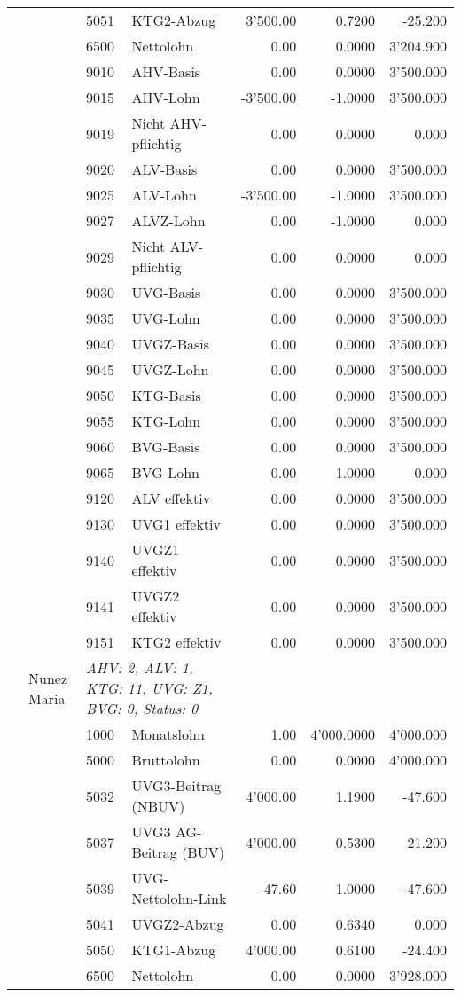 \documentclass[15pt,a4paper]{article}
\begin{document}
\begin{longtable}{@{\extracolsep{\fill}}l l l l|r|r|r}
&&5051&KTG2-Abzug&3'500.00&0.7200&-25.200\\
&&6500&Nettolohn&0.00&0.0000&3'204.900\\
&&9010&AHV-Basis&0.00&0.0000&3'500.000\\
&&9015&AHV-Lohn&-3'500.00&-1.0000&3'500.000\\
&&9019&Nicht AHV-pflichtig&0.00&0.0000&0.000\\
&&9020&ALV-Basis&0.00&0.0000&3'500.000\\
&&9025&ALV-Lohn&-3'500.00&-1.0000&3'500.000\\
&&9027&ALVZ-Lohn&0.00&-1.0000&0.000\\
&&9029&Nicht ALV-pflichtig&0.00&0.0000&0.000\\
&&9030&UVG-Basis&0.00&0.0000&3'500.000\\
&&9035&UVG-Lohn&0.00&0.0000&3'500.000\\
&&9040&UVGZ-Basis&0.00&0.0000&3'500.000\\
&&9045&UVGZ-Lohn&0.00&0.0000&3'500.000\\
&&9050&KTG-Basis&0.00&0.0000&3'500.000\\
&&9055&KTG-Lohn&0.00&0.0000&3'500.000\\
&&9060&BVG-Basis&0.00&0.0000&3'500.000\\
&&9065&BVG-Lohn&0.00&1.0000&0.000\\
&&9120&ALV effektiv&0.00&0.0000&3'500.000\\
&&9130&UVG1 effektiv&0.00&0.0000&3'500.000\\
&&9140&UVGZ1 effektiv&0.00&0.0000&3'500.000\\
&&9141&UVGZ2 effektiv&0.00&0.0000&3'500.000\\
&&9151&KTG2 effektiv&0.00&0.0000&3'500.000\\
\pagebreak
18&Nunez Maria&\multicolumn{2}{l|}{\small\emph{AHV: 2, ALV: 1, KTG: 11, UVG: Z1, BVG: 0, Status: 0}}&& \\
&&1000&Monatslohn&1.00&4'000.0000&4'000.000\\
&&5000&Bruttolohn&0.00&0.0000&4'000.000\\
&&5032&UVG3-Beitrag (NBUV)&4'000.00&1.1900&-47.600\\
&&5037&UVG3 AG-Beitrag (BUV)&4'000.00&0.5300&21.200\\
&&5039&UVG-Nettolohn-Link&-47.60&1.0000&-47.600\\
&&5041&UVGZ2-Abzug&0.00&0.6340&0.000\\
&&5050&KTG1-Abzug&4'000.00&0.6100&-24.400\\
&&6500&Nettolohn&0.00&0.0000&3'928.000\\

\end{longtable}
\end{document}
